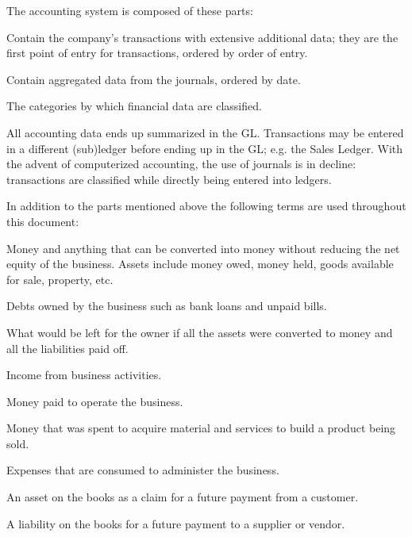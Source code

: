 The accounting system is composed of these parts:
\begin{description}[style=nextline]
        \item [Journals] Contain the company's transactions with extensive additional data; they are the first point of entry for transactions, ordered by order of entry.
        \item [Ledgers] Contain aggregated data from the journals, ordered by date.
        \item [Chart of Accounts] The categories by which financial data are classified.
\end{description}

All accounting data ends up summarized in the \acrshort{GL}. Transactions may be entered in a different (sub)ledger before ending up in the \acrshort{GL}; e.g. the Sales Ledger. With the advent of computerized accounting, the use of journals is in decline: transactions are classified while directly being entered into ledgers.

In addition to the parts mentioned above the following terms are used throughout this document:
\begin{description}[style=nextline]
        \item [Assets] Money and anything that can be converted into money without reducing
        the net equity of the business. Assets include money owed, money held, goods
        available for sale, property, etc.
        \item [Liabilities] Debts owned by the business such as bank loans and unpaid bills.
        \item [Equity] What would be left for the owner if all the assets were converted to
        money and all the liabilities paid off.
        \item [Revenue] Income from business activities.
        \item [Expense] Money paid to operate the business.
        \item [Cost of Goods] Money that was spent to acquire material and services to build a product being sold.
        \item [Operating Expenses] Expenses that are consumed to administer the business.
        \item [Accounts Receivable] An asset on the books as a claim for a future payment
        from a customer.
        \item [Accounts Payable] A liability on the books for a future payment to a supplier
        or vendor.
\end{description}

